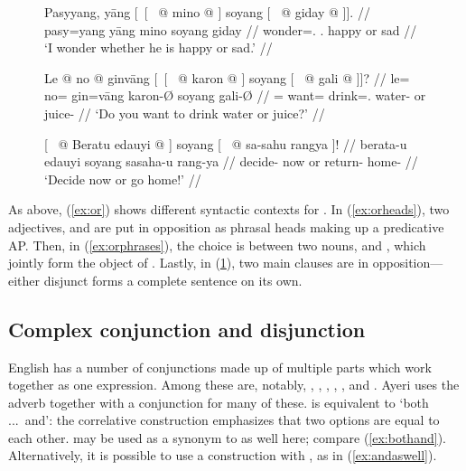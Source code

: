 \begin{figure}[h]
\pex\label{ex:or}
\a\label{ex:orheads}\begingl
	\gla Pasyyang, yāng \textup{[~[~} @ mino @ 
		\textup{]} soyang \textup{[~} @ giday @ 
		\textup{]].} //
	\glb pasy=yang yāng {} mino {} soyang {} giday {} //
	\glc wonder=\Fsg{}.\Aarg{} \TsgM{}.\Aarg{} {} happy {} or {} sad {} //
	\glft `I wonder whether he is happy or sad.' //
\endgl

\a\label{ex:orphrases}\begingl
	\gla Le @ no @ ginvāng \textup{[~[~} @ karon @ \textup{]} 
		soyang \textup{[~} @ gali @ \textup{]]?} //
	\glb le= no= gin=vāng {} karon-Ø {} soyang {} gali-Ø {} //
	\glc \PatTI{}= want= drink=\Second{}.\Aarg{} {} water-\Top{} {} or {} 
		juice-\Top{} {} //
	\glft `Do you want to drink water or juice?' //
\endgl

\a\label{ex:orclauses}\begingl
	\gla \textup{[~} @ Beratu edauyi @ \textup{]} soyang
		\textup{[~} @ sa-sahu rangya \textup{]!} //
	\glb {} berata-u edauyi {} soyang {} sa\til{}saha-u rang-ya {} //
	\glc {} decide-\Imp{} now {} or {} return-\Imp{} home-\Loc{} {} //
	\glft `Decide now or go home!' //
\endgl
\xe
\end{figure}

As above, (\ref{ex:or}) shows different syntactic contexts for 
. In (\ref{ex:orheads}), two adjectives, 
 and  are put in opposition as
phrasal heads making up a predicative AP. Then, in (\ref{ex:orphrases}), the
choice is between two nouns,  and
, which jointly form the object of
. Lastly, in (\ref{ex:orclauses}), two main 
clauses are in opposition---either disjunct forms a complete sentence on its 
own.

\subsection{Complex conjunction and disjunction}
\label{subsec:corrconj}

English has a number of conjunctions made up of multiple parts which work
together as one expression. Among these are, notably,
,
,
,
,
, and
.
Ayeri uses the adverb  together with a
conjunction for many of these. 
is equivalent to `both ...\ and': the correlative construction emphasizes that
two options are equal to each other.  may be used as a
synonym to  as well here; compare (\ref{ex:bothand}).
Alternatively, it is possible to use a construction with
, as in (\ref{ex:andaswell}).

